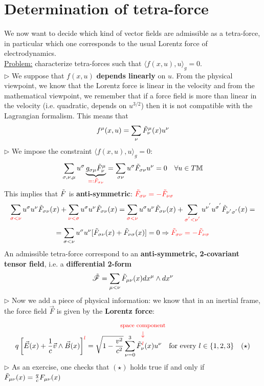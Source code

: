 \documentclass[../main.tex]{subfiles}
\begin{document}
\section{Determination of tetra-force}
We now want to decide which kind of vector fields are admissible as a tetra-force, in particular which one corresponds to the usual Lorentz force of electrodynamics.\\
\underline{Problem:} characterize tetra-forces such that $\langle f(x,u),u \rangle_g=0$.\\
$\triangleright$ We suppose that $f(x,u)$ \textbf{depends linearly} on $u$. From the physical viewpoint, we know that the Lorentz force is linear in the velocity and from the mathematical viewpoint, we remember that if a force field is more than linear in the velocity (i.e. quadratic, depends on $u^{3/2}$) then it is not compatible with the Lagrangian formalism. This means that
\[
f^{\mu}(x,u)=\sum_{\nu}\Tilde{F}_{\nu}^{\mu}(x)u^{\nu}
\]
$\triangleright$ We impose the constraint $\langle f(x,u),u \rangle_g=0$:
\[
\sum_{\sigma,\nu,\mu}u^{\sigma}\underbrace{g_{\sigma\mu}\Tilde{F}_{\nu}^{\mu}}_{\color{red}=:\Tilde{F}_{\sigma\nu}}=\sum_{\sigma\nu}u^{\sigma}\Tilde{F}_{\sigma\nu}u^{\nu}=0 \quad \forall u\in T\mathbb{M}
\]
This implies that $\Tilde{F}$ is \textbf{anti-symmetric}: ${\color{red}\Tilde{F}_{\sigma\nu}=-\Tilde{F}_{\nu\sigma}}$
\[
\sum_{\color{red}\sigma<\nu}u^{\sigma}u^{\nu}\Tilde{F}_{\sigma\nu}(x) + \sum_{\color{red}\nu<\sigma}u^{\sigma}u^{\nu}\Tilde{F}_{\sigma\nu}(x) = \sum_{\color{red}\sigma<\nu}u^{\sigma}u^{\nu}\Tilde{F}_{\sigma\nu}(x) + \sum_{\color{red}\sigma^{'}<\nu^{'}}u^{\nu^{'}}u^{\sigma^{'}}\Tilde{F}_{\nu^{'}\sigma^{'}}(x)=
\]
\[
=\sum_{\sigma<\nu}u^{\sigma}u^{\nu}[\Tilde{F}_{\sigma\nu}(x)+\Tilde{F}_{\nu\sigma}(x)]=0\Rightarrow{\color{red}\Tilde{F}_{\sigma\nu}=-\Tilde{F}_{\nu\sigma}}
\]
An admissible tetra-force correspond to an \textbf{anti-symmetric, 2-covariant tensor field}, i.e. a \textbf{differential 2-form}
\[
\Tilde{\mathcal{F}}=\sum_{\mu<\nu}\Tilde{F}_{\mu\nu}(x)dx^{\mu}\wedge dx^{\nu}
\]
$\triangleright$ Now we add a piece of physical information: we know that in an inertial frame, the force field $\vec{F}$ is given by the \textbf{Lorentz force}:
\[
q\left[\vec{E}(x)+\frac{1}{c}\vec{v}\wedge\vec{B}(x)\right]^{\color{red}l}=\sqrt{1-\frac{v^2}{c^2}}\sum_{\nu=0}^3 \Tilde{F}_{\nu}^{{\color{red}\overset{\mathclap{\tikz \node {$\downarrow$} node [above=1.25ex] {\footnotesize space component};}}l}}(x)u^{\nu} \quad\text{for every } l\in\{1,2,3\} \quad (\star)
\]
$\triangleright$ As an exercise, one checks that $(\star)$ holds true if and only if\\  $\Tilde{F}_{\mu\nu}(x)=\frac{q}{c}F_{\mu\nu}(x)$
\end{document}
